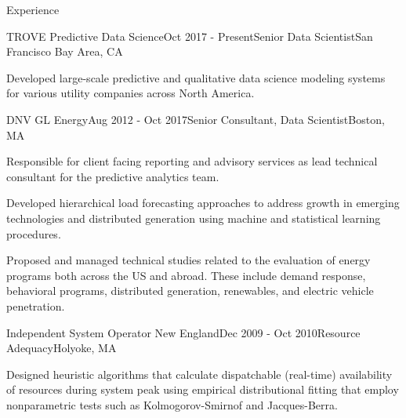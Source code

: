\documentclass{resume} %
\begin{document}

\begin{rSection}{Experience}
\begin{rSubsection}{TROVE Predictive Data Science}{Oct 2017 - Present}{Senior Data Scientist}{San Francisco Bay Area, CA}
\item Developed large-scale predictive and qualitative data science modeling systems for various utility companies across North America.
\end{rSubsection}


\begin{rSubsection}{DNV GL Energy}{Aug 2012 - Oct 2017}{Senior Consultant, Data Scientist}{Boston, MA}
\item Responsible for client facing reporting and advisory services as lead technical consultant for the  predictive analytics team.
\item Developed hierarchical load forecasting approaches to address growth in emerging technologies and distributed generation using machine and statistical learning procedures.
\item Proposed and managed technical studies related to the evaluation of energy programs both across the US and abroad. These include demand response, behavioral programs, distributed generation, renewables, and electric vehicle  penetration. 

\end{rSubsection}


\begin{rSubsection}{Independent System Operator New England}{Dec 2009 - Oct 2010}{Resource Adequacy}{Holyoke, MA}

\item Designed heuristic algorithms that calculate dispatchable (real-time) availability of resources during system peak using empirical distributional fitting that employ nonparametric tests such as Kolmogorov-Smirnof and Jacques-Berra.


\end{rSubsection}
\end{rSection}
\end{document}
